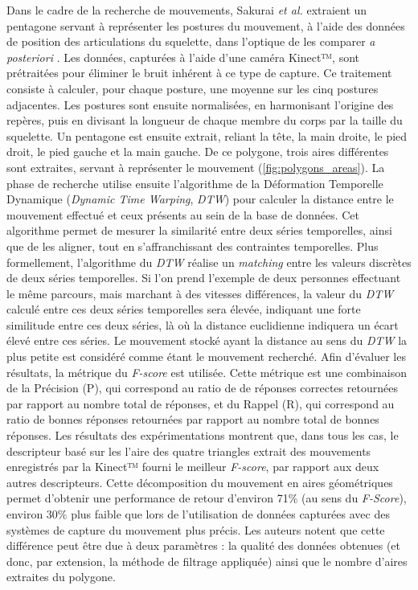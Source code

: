 Dans le cadre de la recherche de mouvements, Sakurai \textit{et al.} extraient un pentagone servant à représenter les postures du mouvement, à l'aide des données de position des articulations du squelette, dans l'optique de les comparer \textit{a posteriori} \parencite{Sakurai2015Ros}. Les données, capturées à l'aide d'une caméra Kinect™, sont prétraitées pour éliminer le bruit inhérent à ce type de capture. Ce traitement consiste à calculer, pour chaque posture, une moyenne sur les cinq postures adjacentes. Les postures sont ensuite normalisées, en harmonisant l'origine des repères, puis en divisant la longueur de chaque membre du corps par la taille du squelette. Un pentagone est ensuite extrait, reliant la tête, la main droite, le pied droit, le pied gauche et la main gauche. De ce polygone, trois aires différentes sont extraites, servant à représenter le mouvement (\ref{fig:polygons_areas}). La phase de recherche utilise ensuite l'algorithme de la Déformation Temporelle Dynamique (\textit{Dynamic Time Warping}, \textit{DTW}) pour calculer la distance entre le mouvement effectué et ceux présents au sein de la base de données. Cet algorithme permet de mesurer la similarité entre deux séries temporelles, ainsi que de les aligner, tout en s'affranchissant des contraintes temporelles. Plus formellement, l'algorithme du \textit{DTW} réalise un \textit{matching} entre les valeurs discrètes de deux séries temporelles. Si l'on prend l'exemple de deux personnes effectuant le même parcours, mais marchant à des vitesses différences,  la valeur du \textit{DTW} calculé entre ces deux séries temporelles sera élevée, indiquant une forte similitude entre ces deux séries, là où la distance euclidienne indiquera un écart élevé entre ces séries. Le mouvement stocké ayant la distance au sens du \textit{DTW} la plus petite est considéré comme étant le mouvement recherché. Afin d'évaluer les résultats, la métrique du \textit{F-score} est utilisée. Cette métrique est une combinaison de la Précision (P), qui correspond au ratio de de réponses correctes retournées par rapport au nombre total de réponses, et du Rappel (R), qui correspond au ratio de bonnes réponses retournées par rapport au nombre total de bonnes réponses. Les résultats des expérimentations montrent que, dans tous les cas, le descripteur basé sur les l'aire des quatre triangles extrait des mouvements enregistrés par la Kinect™ fourni le meilleur \textit{F-score}, par rapport aux deux autres descripteurs. Cette décomposition du mouvement en aires géométriques permet d'obtenir une performance de retour d'environ 71\% (au sens du \textit{F-Score}), environ 30\% plus faible que lors de l'utilisation de données capturées avec des systèmes de capture du mouvement plus précis. Les auteurs notent que cette différence peut être due à deux paramètres : la qualité des données obtenues (et donc, par extension, la méthode de filtrage appliquée) ainsi que le nombre d'aires extraites du polygone.

